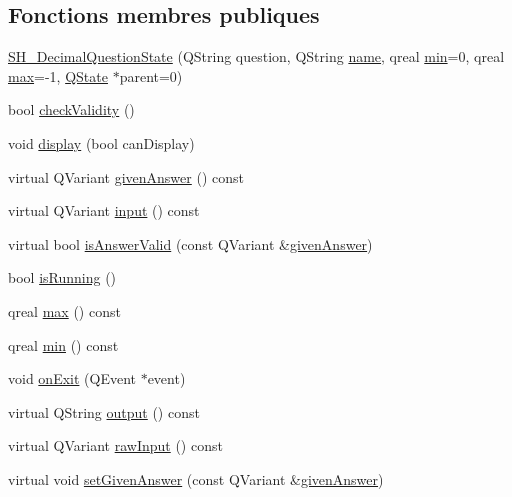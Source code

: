 \subsection*{Fonctions membres publiques}
\begin{DoxyCompactItemize}
\item 
\hyperlink{classSH__DecimalQuestionState_ae327306d90b2a30152f5b64cb75d8a5d}{S\-H\-\_\-\-Decimal\-Question\-State} (Q\-String question, Q\-String \hyperlink{classSH__NamedObject_a9f686c6f2a5bcc08ad03d0cee0151f0f}{name}, qreal \hyperlink{classSH__DecimalQuestionState_ac909214eeb0e370c16718cb698bfec2c}{min}=0, qreal \hyperlink{classSH__DecimalQuestionState_a17bd2b3f5766c5379d7f057d7d4aa178}{max}=-\/1, \hyperlink{classQState}{Q\-State} $\ast$parent=0)
\item 
bool \hyperlink{classSH__QuestionState_a902be003650c33d954d707b2d3ee0bb9}{check\-Validity} ()
\item 
void \hyperlink{classSH__InOutState_a616f88b20478b81b2927a9ddc2b4f521}{display} (bool can\-Display)
\item 
virtual Q\-Variant \hyperlink{classSH__QuestionState_a29cdea8bc55e39e3ed02d24743c30f8c}{given\-Answer} () const 
\item 
virtual Q\-Variant \hyperlink{classSH__InOutState_a8e1b78069343122df7713624a1a5a100}{input} () const 
\item 
virtual bool \hyperlink{classSH__DecimalQuestionState_a99f815a5101340867400f093e89f2210}{is\-Answer\-Valid} (const Q\-Variant \&\hyperlink{classSH__QuestionState_a29cdea8bc55e39e3ed02d24743c30f8c}{given\-Answer})
\item 
bool \hyperlink{classSH__GenericState_a5f731810dad0cacd28828ccbf1539e4e}{is\-Running} ()
\item 
qreal \hyperlink{classSH__DecimalQuestionState_a17bd2b3f5766c5379d7f057d7d4aa178}{max} () const 
\item 
qreal \hyperlink{classSH__DecimalQuestionState_ac909214eeb0e370c16718cb698bfec2c}{min} () const 
\item 
void \hyperlink{classSH__InOutState_afc0433d63375063a43e39adca641e330}{on\-Exit} (Q\-Event $\ast$event)
\item 
virtual Q\-String \hyperlink{classSH__InOutState_a17ed7eaf5e3ed5af80a4f9fe65d5bfd9}{output} () const 
\item 
virtual Q\-Variant \hyperlink{classSH__InOutState_a4c674a54f41d2e6ef951b22393dcd89f}{raw\-Input} () const 
\item 
virtual void \hyperlink{classSH__QuestionState_a8fec0a91aed0b2b1699db17169873eb0}{set\-Given\-Answer} (const Q\-Variant \&\hyperlink{classSH__QuestionState_a29cdea8bc55e39e3ed02d24743c30f8c}{given\-Answer})

\end{DoxyCompactItemize}
